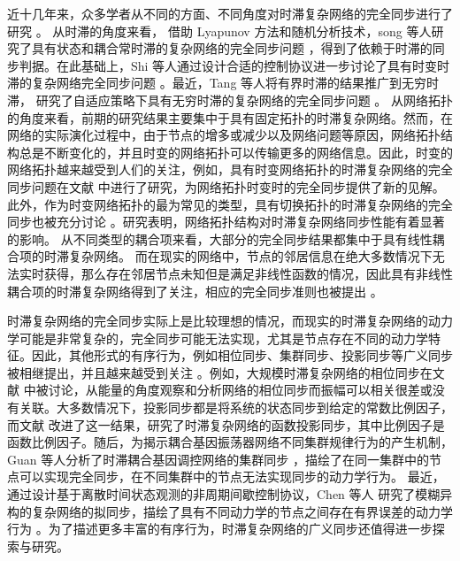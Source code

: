 近十几年来，众多学者从不同的方面、不同角度对时滞复杂网络的完全同步进行了研究 \cite{liang2008exponential153,song2012global2389,shi2016synchronization178,zhang2008adaptive183,stilwell2006sufficient140,hu2021sampled3071811,2019Adaptively2943621,liu2007exponential82,yang2015robust1077,wu2015exponential3097,popov2012robust2343,wang2013robust2097}。%
从时滞的角度来看，
借助 Lyapunov 方法和随机分析技术，song 等人研究了具有状态和耦合常时滞的复杂网络的完全同步问题 \cite{song2012global2389}，得到了依赖于时滞的同步判据。在此基础上，Shi 等人通过设计合适的控制协议进一步讨论了具有时变时滞的复杂网络完全同步问题 \cite{shi2016synchronization178}。最近，Tang 等人将有界时滞的结果推广到无穷时滞， 研究了自适应策略下具有无穷时滞的复杂网络的完全同步问题 \cite{2019Adaptively2943621}。
从网络拓扑的角度来看，前期的研究结果主要集中于具有固定拓扑的时滞复杂网络。然而，在网络的实际演化过程中，由于节点的增多或减少以及网络问题等原因，网络拓扑结构总是不断变化的，并且时变的网络拓扑可以传输更多的网络信息。因此，时变的网络拓扑越来越受到人们的关注，例如，具有时变网络拓扑的时滞复杂网络的完全同步问题在文献 \cite{stilwell2006sufficient140,popov2012robust2343} 中进行了研究，为网络拓扑时变时的完全同步提供了新的见解。此外，作为时变网络拓扑的最为常见的类型，具有切换拓扑的时滞复杂网络的完全同步也被充分讨论 \cite{hu2021sampled3071811,wang2013robust2097}。研究表明，网络拓扑结构对时滞复杂网络同步性能有着显著的影响。 %
从不同类型的耦合项来看，大部分的完全同步结果都集中于具有线性耦合项的时滞复杂网络。 而在现实的网络中，节点的邻居信息在绝大多数情况下无法实时获得，那么存在邻居节点未知但是满足非线性函数的情况，因此具有非线性耦合项的时滞复杂网络得到了关注，相应的完全同步准则也被提出 \cite{liu2007exponential82,yang2015robust1077,wu2015exponential3097}。

时滞复杂网络的完全同步实际上是比较理想的情况，而现实的时滞复杂网络的动力学可能是非常复杂的，完全同步可能无法实现，尤其是节点存在不同的动力学特征。因此，其他形式的有序行为，例如相位同步、集群同步、投影同步等广义同步被相继提出，并且越来越受到关注 \cite{2009The1276,2013Function1182,Zhi2017Cluster585,wang2018generalized6597,chen2021quasi3103597,lu2019phase122419,han2016modified1650126}。例如，大规模时滞复杂网络的相位同步在文献 \cite{2009The1276,lu2019phase122419} 中被讨论，从能量的角度观察和分析网络的相位同步而振幅可以相关很差或没有关联。大多数情况下，投影同步都是将系统的状态同步到给定的常数比例因子，而文献 \cite{2013Function1182,han2016modified1650126} 改进了这一结果，研究了时滞复杂网络的函数投影同步，其中比例因子是函数比例因子。随后，为揭示耦合基因振荡器网络不同集群规律行为的产生机制，Guan 等人分析了时滞耦合基因调控网络的集群同步
\cite{Zhi2017Cluster585}，描绘了在同一集群中的节点可以实现完全同步，在不同集群中的节点无法实现同步的动力学行为。 最近，通过设计基于离散时间状态观测的非周期间歇控制协议，Chen 等人 
研究了模糊异构的复杂网络的拟同步，描绘了具有不同动力学的节点之间存在有界误差的动力学行为 \cite{chen2021quasi3103597}。为了描述更多丰富的有序行为，时滞复杂网络的广义同步还值得进一步探索与研究。 
